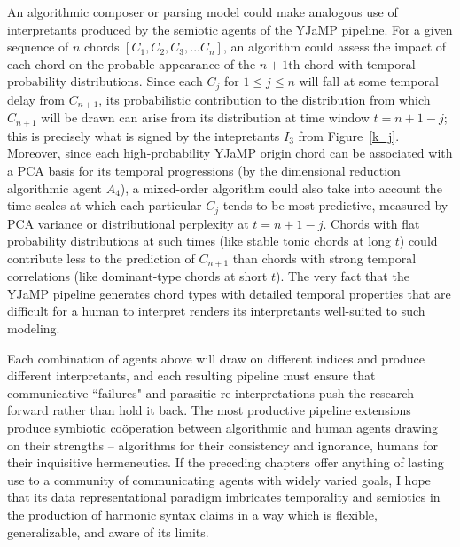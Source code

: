 \begin{enumerate}
An algorithmic composer or parsing model could make analogous use of interpretants produced by the semiotic agents of the YJaMP pipeline.  For a given sequence of $n$ chords $[C_1,C_2,C_3,...C_n]$, an algorithm could assess the impact of each chord on the probable appearance of the $n+1$th chord with temporal probability distributions.  Since each $C_j$ for $1\leq j \leq n$ will fall at some temporal delay from $C_{n+1}$, its probabilistic contribution to the distribution from which $C_{n+1}$ will be drawn can arise from its distribution at time window $t= n+1-j$; this is precisely what is signed by the intepretants $I_3$ from Figure~\ref{k_j}.  Moreover, since each high-probability YJaMP origin chord can be associated with a PCA basis for its temporal progressions (by the dimensional reduction algorithmic agent $A_4$), a mixed-order algorithm could also take into account the time scales at which each particular $C_j$ tends to be most predictive, measured by PCA variance or distributional perplexity at $t=n+1-j$.  Chords with flat probability distributions at such times (like stable tonic chords at long $t$) could contribute less to the prediction of $C_{n+1}$ than chords with strong temporal correlations (like dominant-type chords at short $t$).  The very fact that the YJaMP pipeline generates chord types with detailed temporal properties that are difficult for a human to interpret renders its interpretants well-suited to such modeling.
\end{enumerate}

Each combination of agents above will draw on different indices and produce different interpretants, and each resulting pipeline must ensure that communicative ``failures" and parasitic re-interpretations push the research forward rather than hold it back.  The most productive pipeline extensions produce symbiotic co\"{o}peration between algorithmic and human agents drawing on their strengths -- algorithms for their consistency and ignorance, humans for their inquisitive hermeneutics.  If the preceding chapters offer anything of lasting use to a community of communicating agents with widely varied goals, I hope that its data representational paradigm imbricates temporality and semiotics in the production of harmonic syntax claims in a way which is flexible, generalizable, and aware of its limits.